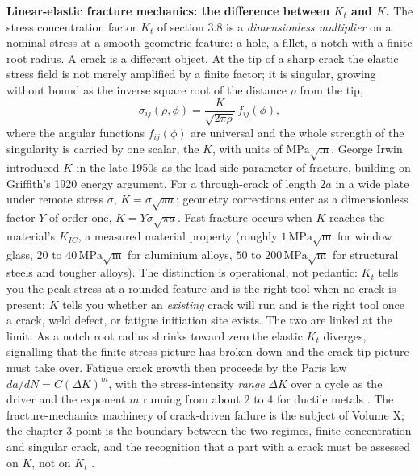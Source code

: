 \begin{mastery}
\textbf{Linear-elastic fracture mechanics: the difference between $K_t$
and $K$.} The stress concentration factor $K_t$ of section 3.8 is a
\emph{dimensionless multiplier} on a nominal stress at a smooth
geometric feature: a hole, a fillet, a notch with a finite root radius.
A crack is a different object. At the tip of a sharp crack the elastic
stress field is not merely amplified by a finite factor; it is singular,
growing without bound as the inverse square root of the distance $\rho$
from the tip,
\[
\sigma_{ij}(\rho, \phi) = \frac{K}{\sqrt{2\pi\rho}}\, f_{ij}(\phi),
\]
where the angular functions $f_{ij}(\phi)$ are universal and the whole
strength of the singularity is carried by one scalar, the
 $K$, with units of $\text{MPa}\sqrt{
\text{m}}$. George Irwin introduced $K$ in the late 1950s as the
load-side parameter of fracture, building on Griffith's 1920 energy
argument. For a through-crack of length $2a$ in a wide plate under
remote stress $\sigma$, $K = \sigma\sqrt{\pi a}$; geometry corrections
enter as a dimensionless factor $Y$ of order one, $K = Y\sigma\sqrt{\pi
a}$. Fast fracture occurs when $K$ reaches the material's
 $K_{IC}$, a measured material property
(roughly $1\,\text{MPa}\sqrt{\text{m}}$ for window glass, $20$ to $40\,
\text{MPa}\sqrt{\text{m}}$ for aluminium alloys, $50$ to $200\,\text{
MPa}\sqrt{\text{m}}$ for structural steels and tougher alloys). The
distinction is operational, not pedantic: $K_t$ tells you the peak
stress at a rounded feature and is the right tool when no crack is
present; $K$ tells you whether an \emph{existing} crack will run and is
the right tool once a crack, weld defect, or fatigue initiation site
exists. The two are linked at the limit. As a notch root radius shrinks
toward zero the elastic $K_t$ diverges, signalling that the finite-stress
picture has broken down and the crack-tip picture must take over.
Fatigue crack growth then proceeds by the Paris law $da/dN = C(\Delta
K)^m$, with the stress-intensity \emph{range} $\Delta K$ over a cycle as
the driver and the exponent $m$ running from about $2$ to $4$ for
ductile metals \cite{paper:paris-erdogan1963}. The fracture-mechanics
machinery of crack-driven failure is the subject of Volume X; the
chapter-3 point is the boundary between the two regimes, finite
concentration and singular crack, and the recognition that a part with a
crack must be assessed on $K$, not on $K_t$
\cite{text:hertzberg-fatigue}.
\end{mastery}

